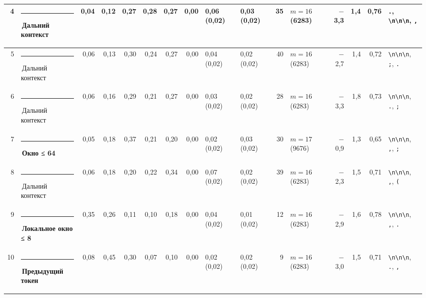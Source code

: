 \documentclass[10pt]{article}
\begin{document}
\begin{minipage}{\linewidth}
\begin{center}
{\begin{tabular}{|r|l|r|r|r|r|r|r|l|l|r|l|r|r|r|l|}
4 & \textcolor[HTML]{C3C2B7}{\rule{0.62em}{0.62em}}\,Дальний контекст & 0,04 & 0,12 & 0,27 & 0,28 & 0,27 & 0,00 & 0,06 (0,02) & 0,03 (0,02) & 35 & $m{=}16$ (6283) & $-$3,3 & 1,4 & 0,76 & \texttt{\textvisiblespace{}.}, \texttt{\textvisiblespace{}\textbackslash{}n\textbackslash{}n\textbackslash{}n}, \texttt{\textvisiblespace{},} \\ \hline
5 & \textcolor[HTML]{C3C2B7}{\rule{0.62em}{0.62em}}\,Дальний контекст & 0,06 & 0,13 & 0,30 & 0,24 & 0,27 & 0,00 & 0,04 (0,02) & 0,02 (0,02) & 40 & $m{=}16$ (6283) & $-$2,7 & 1,4 & 0,72 & \texttt{\textvisiblespace{}\textbackslash{}n\textbackslash{}n\textbackslash{}n}, \texttt{\textvisiblespace{};}, \texttt{\textvisiblespace{}.} \\ \hline
6 & \textcolor[HTML]{C3C2B7}{\rule{0.62em}{0.62em}}\,Дальний контекст & 0,06 & 0,16 & 0,29 & 0,21 & 0,27 & 0,00 & 0,03 (0,02) & 0,02 (0,02) & 28 & $m{=}16$ (6283) & $-$3,3 & 1,8 & 0,73 & \texttt{\textvisiblespace{}\textbackslash{}n\textbackslash{}n\textbackslash{}n}, \texttt{\textvisiblespace{}.}, \texttt{\textvisiblespace{};} \\ \hline
7 & \textcolor[HTML]{EDA100}{\rule{0.62em}{0.62em}}\,\textbf{Окно ≤ 64} & 0,05 & 0,18 & 0,37 & 0,21 & 0,20 & 0,00 & 0,02 (0,02) & 0,03 (0,02) & 30 & $m{=}17$ (9676) & $-$0,9 & 1,3 & 0,65 & \texttt{\textvisiblespace{}\textbackslash{}n\textbackslash{}n\textbackslash{}n}, \texttt{\textvisiblespace{},}, \texttt{\textvisiblespace{};} \\ \hline
8 & \textcolor[HTML]{C3C2B7}{\rule{0.62em}{0.62em}}\,Дальний контекст & 0,06 & 0,18 & 0,20 & 0,22 & 0,34 & 0,00 & 0,07 (0,02) & 0,02 (0,02) & 39 & $m{=}16$ (6283) & $-$2,3 & 1,5 & 0,71 & \texttt{\textvisiblespace{}\textbackslash{}n\textbackslash{}n\textbackslash{}n}, \texttt{\textvisiblespace{},}, \texttt{\textvisiblespace{}(} \\ \hline
9 & \textcolor[HTML]{1BAF7A}{\rule{0.62em}{0.62em}}\,\textbf{Локальное окно ≤ 8} & 0,35 & 0,26 & 0,11 & 0,10 & 0,18 & 0,00 & 0,04 (0,02) & 0,01 (0,02) & 12 & $m{=}16$ (6283) & $-$2,9 & 1,6 & 0,78 & \texttt{\textvisiblespace{}\textbackslash{}n\textbackslash{}n\textbackslash{}n}, \texttt{\textvisiblespace{},}, \texttt{\textvisiblespace{}.} \\ \hline
10 & \textcolor[HTML]{2A78D6}{\rule{0.62em}{0.62em}}\,\textbf{Предыдущий токен} & 0,08 & 0,45 & 0,30 & 0,07 & 0,10 & 0,00 & 0,02 (0,02) & 0,02 (0,02) & 9 & $m{=}16$ (6283) & $-$3,0 & 1,5 & 0,71 & \texttt{\textvisiblespace{}\textbackslash{}n\textbackslash{}n\textbackslash{}n}, \texttt{\textvisiblespace{}.}, \texttt{\textvisiblespace{},} \\ \hline

\end{tabular}}
\end{center}
\end{minipage}
\end{document}
